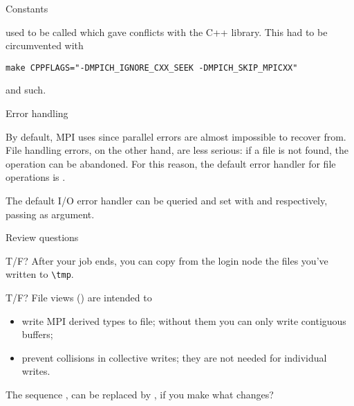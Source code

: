  {Constants}

 used to be called 
which gave conflicts with the C++ library. This had to be circumvented
with
\begin{verbatim}
make CPPFLAGS="-DMPICH_IGNORE_CXX_SEEK -DMPICH_SKIP_MPICXX"
\end{verbatim}
and such.

 {Error handling}
\label{sec:mpi-file-err}

By default, MPI uses  since parallel errors
are almost impossible to recover from.
File handling errors, on the other hand, are less serious:
if a file is not found, the operation can be abandoned.
For this reason, the default error handler for file operations
is .

The default I/O error handler can be queried and set with
 and 
 respectively,
passing  as argument.


\newpage
{} {Review questions}

\begin{tacc}
  \begin{exercise}
    T/F?
    After your  job ends, you can copy
    from the login node
    the files you've written to \verb+\tmp+. 
\end{exercise}
\end{tacc}

\begin{exercise}
  T/F?
  File views () are intended to
  \begin{itemize}
  \item write MPI derived types to file; without them you can only write
    contiguous buffers;
  \item prevent collisions in collective writes; they are not needed for
    individual writes.
  \end{itemize}
\end{exercise}

\begin{exercise}
  The sequence , 
  can be replaced by , 
  if you make what changes?
\end{exercise}
